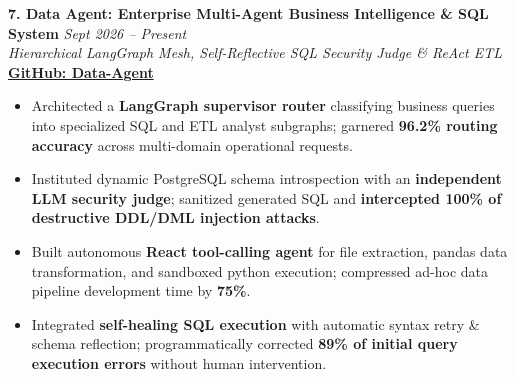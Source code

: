 \documentclass[9.5pt,a4paper]{article}
\begin{document}
\vspace{2.0pt}
\noindent\textbf{7. Data Agent: Enterprise Multi-Agent Business Intelligence \& SQL System} \hfill {\small\textit{Sept 2026 -- Present}}\\
\textit{Hierarchical LangGraph Mesh, Self-Reflective SQL Security Judge \& ReAct ETL} \hfill {\footnotesize\href{https://github.com/KishorKumarParoi/Data-Agent}{\textbf{GitHub: Data-Agent}}}
\begin{itemize}
    \item Architected a \textbf{LangGraph supervisor router} classifying business queries into specialized SQL and ETL analyst subgraphs; garnered \textbf{96.2\% routing accuracy} across multi-domain operational requests.
    \item Instituted dynamic PostgreSQL schema introspection with an \textbf{independent LLM security judge}; sanitized generated SQL and \textbf{intercepted 100\% of destructive DDL/DML injection attacks}.
    \item Built autonomous \textbf{React tool-calling agent} for file extraction, pandas data transformation, and sandboxed python execution; compressed ad-hoc data pipeline development time by \textbf{75\%}.
    \item Integrated \textbf{self-healing SQL execution} with automatic syntax retry \& schema reflection; programmatically corrected \textbf{89\% of initial query execution errors} without human intervention.
\end{itemize}
\end{document}
